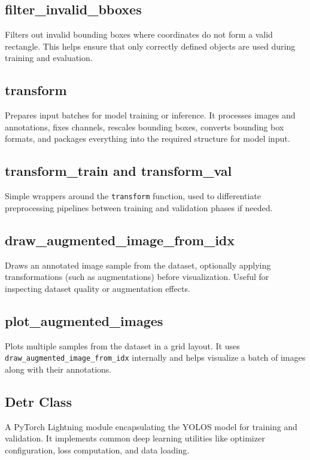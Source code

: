 \vspace{-1.25em}
\subsection*{filter\_invalid\_bboxes}
Filters out invalid bounding boxes where coordinates do not form a valid rectangle. This helps ensure that only correctly defined objects are used during training and evaluation.

\vspace{-1.25em}
\subsection*{transform}
Prepares input batches for model training or inference. It processes images and annotations, fixes channels, rescales bounding boxes, converts bounding box formats, and packages everything into the required structure for model input.

\vspace{-1.25em}
\subsection*{transform\_train and transform\_val}
Simple wrappers around the \texttt{transform} function, used to differentiate preprocessing pipelines between training and validation phases if needed.

\vspace{-1.25em}
\subsection*{draw\_augmented\_image\_from\_idx}
Draws an annotated image sample from the dataset, optionally applying transformations (such as augmentations) before visualization. Useful for inspecting dataset quality or augmentation effects.

\vspace{-1.25em}
\subsection*{plot\_augmented\_images}
Plots multiple samples from the dataset in a grid layout. It uses \texttt{draw\_augmented\_image\_from\_idx} internally and helps visualize a batch of images along with their annotations.

\vspace{-1.25em}
\subsection*{Detr Class}
A PyTorch Lightning module encapsulating the YOLOS model for training and validation. It implements common deep learning utilities like optimizer configuration, loss computation, and data loading.


